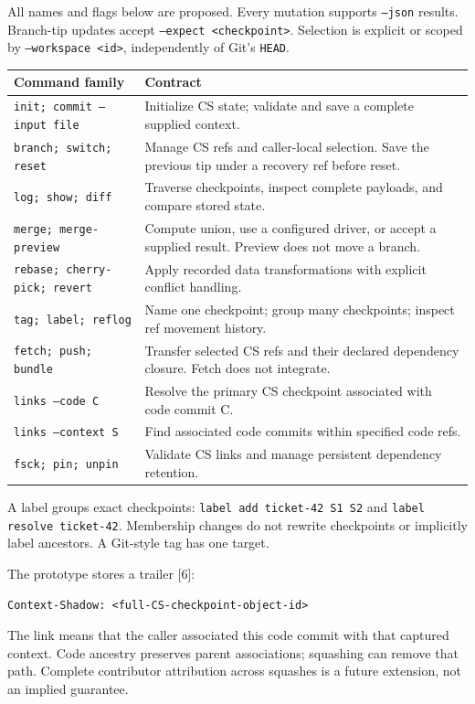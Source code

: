 \documentclass[11pt,letterpaper]{article}
\newcommand{\sect}[1]{\vspace{5pt}{\large\bfseries\textcolor{ink}{#1}}\par\vspace{1pt}}
\newcommand{\subsect}[1]{\vspace{3pt}{\bfseries\textcolor{ink}{#1}}\par}
\newcommand{\code}[1]{{\small\texttt{#1}}}
\begin{document}
\newpage
\sect{4. Tool interface and code associations}
\subsect{Command contract}
All names and flags below are proposed. Every mutation supports \code{--json}
results. Branch-tip updates accept \code{--expect <checkpoint>}. Selection is
explicit or scoped by \code{--workspace <id>}, independently of Git's \code{HEAD}.

\begingroup\small
\begin{tabularx}{\linewidth}{p{2.10in}Y}
\toprule
\textbf{Command family} & \textbf{Contract}\\
\midrule
\code{init; commit --input file} & Initialize CS state; validate and save a complete supplied context.\\
\code{branch; switch; reset} & Manage CS refs and caller-local selection. Save the previous tip under a recovery ref before reset.\\
\code{log; show; diff} & Traverse checkpoints, inspect complete payloads, and compare stored state.\\
\code{merge; merge-preview} & Compute union, use a configured driver, or accept a supplied result. Preview does not move a branch.\\
\code{rebase; cherry-pick; revert} & Apply recorded data transformations with explicit conflict handling.\\
\code{tag; label; reflog} & Name one checkpoint; group many checkpoints; inspect ref movement history.\\
\code{fetch; push; bundle} & Transfer selected CS refs and their declared dependency closure. Fetch does not integrate.\\
\code{links --code C} & Resolve the primary CS checkpoint associated with code commit C.\\
\code{links --context S} & Find associated code commits within specified code refs.\\
\code{fsck; pin; unpin} & Validate CS links and manage persistent dependency retention.\\
\bottomrule
\end{tabularx}
\endgroup
{}

A label groups exact checkpoints: \code{label add ticket-42 S1 S2} and
\code{label resolve ticket-42}. Membership changes do not rewrite checkpoints
or implicitly label ancestors. A Git-style tag has one target.

\subsect{A code commit points to one exact CS checkpoint}
The prototype stores a trailer [6]:
\begin{lstlisting}
Context-Shadow: <full-CS-checkpoint-object-id>
\end{lstlisting}
The link means that the caller associated this code commit with that captured
context. Code ancestry preserves parent associations; squashing can remove
that path. Complete contributor attribution across squashes is a future
extension, not an implied guarantee.
\end{document}

